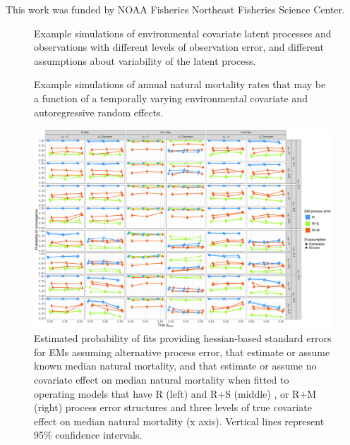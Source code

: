 \documentclass[
  12pt,
]{article}
\newlength{\cslhangindent}
\newlength{\cslentryspacingunit} %
\newenvironment{CSLReferences}[2] %
 {%
  \setlength{\parindent}{0pt}
  \ifodd #1
  \let\oldpar\par
  \def\par{\hangindent=\cslhangindent\oldpar}
  \fi
  \setlength{\parskip}{#2\cslentryspacingunit}
 }%
 {}
\begin{document}
This work was funded by NOAA Fisheries Northeast Fisheries Science Center.

\pagebreak



\hypertarget{refs}{}
\begin{CSLReferences}{0}{0}
\end{CSLReferences}

\pagebreak

\begin{figure}
\caption{Example simulations of environmental covariate latent processes and observations with different levels of observation error, and different assumptions about variability of the latent process.}\label{om_ecov_example}
\begin{center}
\end{center}
\end{figure}

\begin{landscape}
\begin{figure}
\caption{Example simulations of annual natural mortality rates that may be a function of a temporally varying environmental covariate and autoregressive random effects.}\label{M_example}
\begin{center}
\end{center}
\end{figure}
\end{landscape}

\begin{landscape}
\begin{figure}
\begin{center}
\includegraphics{convergence}
\end{center}
\caption{Estimated probability of fits providing hessian-based standard errors for EMs assuming alternative process error, that estimate or assume known median natural mortality, and that estimate or assume no covariate effect on median natural mortality when fitted to operating models that have R (left) and R+S (middle) , or R+M (right) process error structures and three levels of true covariate effect on median natural mortality (x axis). Vertical lines represent 95\% confidence intervals.}\label{convergence}
\end{figure}
\end{landscape}
\end{document}

